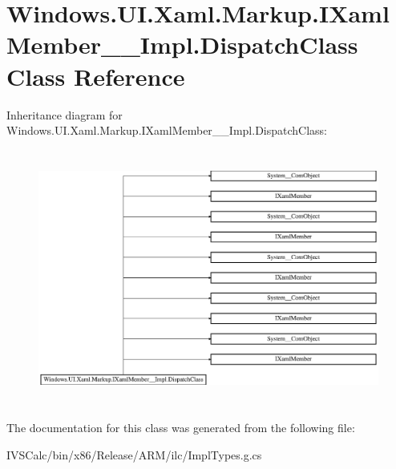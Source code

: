 \hypertarget{class_windows_1_1_u_i_1_1_xaml_1_1_markup_1_1_i_xaml_member_____impl_1_1_dispatch_class}{}\section{Windows.\+U\+I.\+Xaml.\+Markup.\+I\+Xaml\+Member\+\_\+\+\_\+\+Impl.\+Dispatch\+Class Class Reference}
\label{class_windows_1_1_u_i_1_1_xaml_1_1_markup_1_1_i_xaml_member_____impl_1_1_dispatch_class}
Inheritance diagram for Windows.\+U\+I.\+Xaml.\+Markup.\+I\+Xaml\+Member\+\_\+\+\_\+\+Impl.\+Dispatch\+Class\+:\begin{figure}[H]
\begin{center}
\leavevmode
\includegraphics[height=8.438356cm]{class_windows_1_1_u_i_1_1_xaml_1_1_markup_1_1_i_xaml_member_____impl_1_1_dispatch_class}
\end{center}
\end{figure}


The documentation for this class was generated from the following file\+:\begin{DoxyCompactItemize}
\item 
I\+V\+S\+Calc/bin/x86/\+Release/\+A\+R\+M/ilc/Impl\+Types.\+g.\+cs\end{DoxyCompactItemize}

